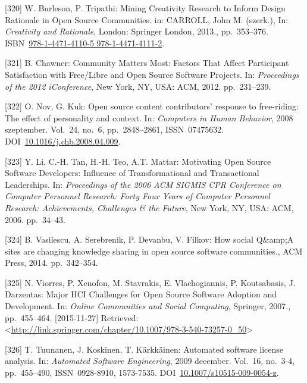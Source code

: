 \documentclass[12pt,magyar,a4paper,oneside]{scrreprt}
\begin{document}
\leavevmode\hypertarget{ref-carroll_mining_2013}{}%
{[}320{]} W. Burleson, P. Tripathi: Mining Creativity Research to Inform
Design Rationale in Open Source Communities. in: CARROLL, John M.
(szerk.), In: \emph{Creativity and Rationale}, London: Springer London,
2013., pp.~353--376.
ISBN~\href{https://worldcat.org/isbn/978-1-4471-4110-5\%20978-1-4471-4111-2}{978-1-4471-4110-5 978-1-4471-4111-2}.

\leavevmode\hypertarget{ref-chawner_community_2012}{}%
{[}321{]} B. Chawner: Community Matters Most: Factors That Affect
Participant Satisfaction with Free/Libre and Open Source Software
Projects. In: \emph{Proceedings of the 2012 iConference}, New York, NY,
USA: ACM, 2012. pp.~231--239.

\leavevmode\hypertarget{ref-nov_open_2008}{}%
{[}322{]} O. Nov, G. Kuk: Open source content contributors' response to
free-riding: The effect of personality and context. In: \emph{Computers
in Human Behavior}, 2008 szeptember. Vol.~24, no.~6, pp.~2848--2861,
ISSN~07475632.
DOI~\href{https://doi.org/10.1016/j.chb.2008.04.009}{10.1016/j.chb.2008.04.009}.

\leavevmode\hypertarget{ref-li_motivating_2006}{}%
{[}323{]} Y. Li, C.-H. Tan, H.-H. Teo, A.T. Mattar: Motivating Open
Source Software Developers: Influence of Transformational and
Transactional Leaderships. In: \emph{Proceedings of the 2006 ACM SIGMIS
CPR Conference on Computer Personnel Research: Forty Four Years of
Computer Personnel Research: Achievements, Challenges \& the Future},
New York, NY, USA: ACM, 2006. pp.~34--43.

\leavevmode\hypertarget{ref-vasilescu_how_2014}{}%
{[}324{]} B. Vasilescu, A. Serebrenik, P. Devanbu, V. Filkov: How social
Q\&amp;A sites are changing knowledge sharing in open source software
communities., ACM Press, 2014. pp.~342--354.

\leavevmode\hypertarget{ref-viorres_major_2007}{}%
{[}325{]} N. Viorres, P. Xenofon, M. Stavrakis, E. Vlachogiannis, P.
Koutsabasis, J. Darzentas: Major HCI Challenges for Open Source Software
Adoption and Development. In: \emph{Online Communities and Social
Computing}, Springer, 2007., pp.~455--464. {[}2015-11-27{]} Retrieved:
\textless{}\url{http://link.springer.com/chapter/10.1007/978-3-540-73257-0_50}\textgreater{}

\leavevmode\hypertarget{ref-tuunanen_automated_2009}{}%
{[}326{]} T. Tuunanen, J. Koskinen, T. Kärkkäinen: Automated software
license analysis. In: \emph{Automated Software Engineering}, 2009
december. Vol.~16, no.~3-4, pp.~455--490, ISSN~0928-8910, 1573-7535.
DOI~\href{https://doi.org/10.1007/s10515-009-0054-z}{10.1007/s10515-009-0054-z}.
\end{document}
